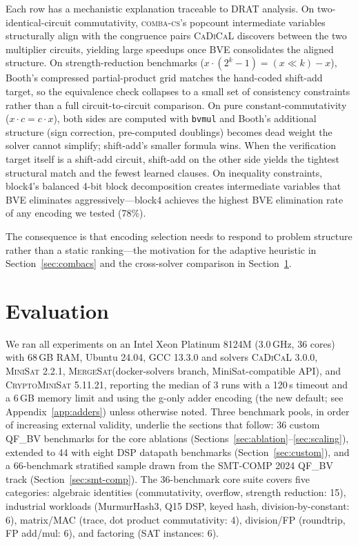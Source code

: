 \documentclass[a4paper]{ceurart}
\newcommand{\combacs}{\textsc{comba-cs}\xspace}
\newcommand{\cadical}{\textsc{CaDiCaL}\xspace}
\newcommand{\minisat}{\textsc{MiniSat}\xspace}
\newcommand{\mergesat}{\textsc{MergeSat}\xspace}
\newcommand{\cryptominisat}{\textsc{CryptoMiniSat}\xspace}
\begin{document}
Each row has a mechanistic explanation traceable to DRAT analysis.
On two-identical-circuit commutativity, \combacs's popcount
intermediate variables structurally align with the congruence
pairs \cadical discovers between the two multiplier circuits,
yielding large speedups once BVE consolidates the aligned
structure. On strength-reduction benchmarks ($x \cdot (2^{k}-1) =
(x \ll k) - x$), Booth's compressed partial-product grid matches
the hand-coded shift-add target, so the equivalence check
collapses to a small set of consistency constraints rather than a
full circuit-to-circuit comparison. On pure constant-commutativity
($x \cdot c = c \cdot x$), both sides are computed with
\texttt{bvmul} and Booth's additional structure (sign correction,
pre-computed doublings) becomes dead weight the solver cannot
simplify; shift-add's smaller formula wins. When the verification
target itself is a shift-add circuit, shift-add on the other side
yields the tightest structural match and the fewest learned
clauses. On inequality constraints, block4's balanced 4-bit block
decomposition creates intermediate variables that BVE eliminates
aggressively---block4 achieves the highest BVE elimination rate of
any encoding we tested (78\%).

The consequence is that encoding selection needs to respond to
problem structure rather than a static ranking---the motivation
for the adaptive heuristic in Section~\ref{sec:combacs} and the
cross-solver comparison in Section~\ref{sec:evaluation}.

\section{Evaluation}
\label{sec:evaluation}

We ran all experiments on an Intel Xeon Platinum 8124M (3.0\,GHz,
36 cores) with 68\,GB RAM, Ubuntu 24.04, GCC 13.3.0 and solvers
\cadical 3.0.0, \minisat 2.2.1, \mergesat (docker-solvers branch,
MiniSat-compatible API), and \cryptominisat 5.11.21, reporting the
median of 3 runs with a 120\,s timeout and a 6\,GB memory limit and
using the g-only adder encoding (the new default; see
Appendix~\ref{app:adders}) unless otherwise noted. Three benchmark
pools, in order of increasing external validity, underlie the
sections that follow: 36 custom QF\_BV benchmarks for the core
ablations (Sections~\ref{sec:ablation}--\ref{sec:scaling}),
extended to 44 with eight DSP datapath benchmarks
(Section~\ref{sec:custom}), and a 66-benchmark stratified sample
drawn from the SMT-COMP 2024 QF\_BV track
(Section~\ref{sec:smt-comp}). The 36-benchmark core suite covers
five categories: algebraic identities (commutativity, overflow,
strength reduction: 15), industrial workloads (MurmurHash3, Q15
DSP, keyed hash, division-by-constant: 6), matrix/MAC (trace, dot
product commutativity: 4), division/FP (roundtrip, FP add/mul: 6),
and factoring (SAT instances: 6).
\end{document}
